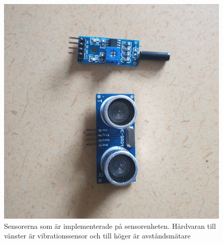 \documentclass{article}
\begin{document}
\begin{figure}[!tbp]
    \centering
    \includegraphics[scale=0.04]{Projektrapport/sensor.png}
    \caption {Sensorerna som är implementerade på sensorenheten. Hårdvaran till vänster är vibrationssensor och till höger är avståndsmätare}
    \label{fig:drawing}
\end{figure}
\end{document}
